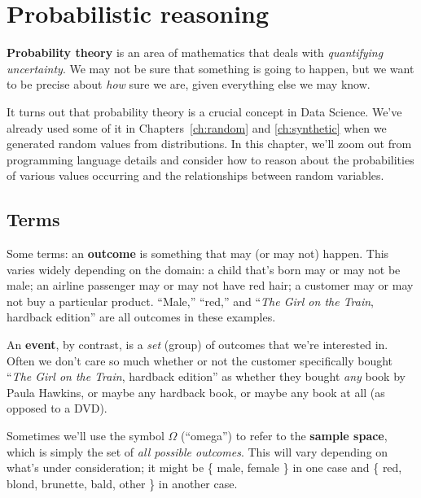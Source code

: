 \chapter{Probabilistic reasoning}
\label{ch:prob}


\textbf{Probability theory} is an area of mathematics that deals with
\textit{quantifying uncertainty}. We may not be sure that something is going to
happen, but we want to be precise about \textit{how} sure we are, given
everything else we may know.


It turns out that probability theory is a crucial concept in Data Science.
We've already used some of it in Chapters~\ref{ch:random} and
\ref{ch:synthetic} when we generated random values from distributions. In this
chapter, we'll zoom out from programming language details and consider how to
reason about the probabilities of various values occurring and the
relationships between random variables.

\section{Terms}


Some terms: an \textbf{outcome} is something that may (or may not) happen. This
varies widely depending on the domain: a child that's born may or may not be
male; an airline passenger may or may not have red hair; a customer may or may
not buy a particular product. ``Male,'' ``red,'' and ``\textit{The Girl on the
Train}, hardback edition'' are all outcomes in these examples.


An \textbf{event}, by contrast, is a \textit{set} (group) of outcomes that
we're interested in. Often we don't care so much whether or not the customer
specifically bought ``\textit{The Girl on the Train}, hardback edition'' as
whether they bought \textit{any} book by Paula Hawkins, or maybe any hardback
book, or maybe any book at all (as opposed to a DVD).


Sometimes we'll use the symbol $\Omega$ (``omega'') to refer to the
\textbf{sample space}, which is simply the set of \textit{all possible
outcomes}. This will vary depending on what's under consideration; it might be
\{ male, female \} in one case and
\{ red,
blond, brunette, bald, other \} in another case.

